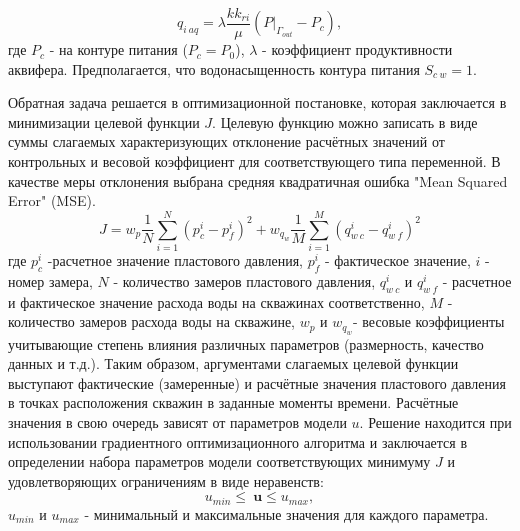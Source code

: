 \documentclass{article}
\begin{document}
\begin{equation} \label{qaq}
q_{i\:aq} = \lambda \frac{kk_{ri}}{\mu}(P|_{\Gamma_{out}}-P_c),
\end{equation}
где $P_{c}$ - на контуре питания ($P_c = P_0$), $\lambda$ - коэффициент продуктивности аквифера. Предполагается, что водонасыщенность контура питания $S_{c\:w} = 1$.

Обратная задача решается в оптимизационной постановке, которая заключается в минимизации целевой функции $J$. Целевую функцию можно записать в виде суммы слагаемых характеризующих отклонение расчётных значений от контрольных и весовой коэффициент для соответствующего типа переменной. В качестве меры отклонения выбрана средняя квадратичная ошибка "Mean Squared Error" (MSE). 
\begin{equation} \label{mape}
	J=w_p\frac{1}{N}\sum_{i=1}^N{\left(p_c^i-p_f^i\right)^2}+w_{q_w}\frac{1}{M}\sum_{i=1}^M{\left(q_{w\:c}^i-q_{w\:f}^i\right)^2}
\end{equation}
где $p_c^i$ -расчетное значение пластового давления, $p_f^i$ - фактическое значение, $i$ - номер замера, $N$ - количество замеров пластового давления, $q_{w\:c}^i$ и $q_{w\:f}^i$ - расчетное и фактическое значение расхода воды на скважинах соответственно, $M$ - количество замеров расхода воды на скважине, $w_p$ и $w_{q_w}$- весовые коэффициенты учитывающие степень влияния различных параметров (размерность, качество данных и т.д.). Таким образом, аргументами слагаемых целевой функции выступают фактические (замеренные) и расчётные значения пластового давления в точках расположения скважин в заданные моменты времени. 
 Расчётные значения в свою очередь зависят от параметров модели $u$. Решение находится при использовании градиентного оптимизационного алгоритма и заключается в определении набора параметров модели соответствующих минимуму $J$ и удовлетворяющих ограничениям в виде неравенств:
\begin{equation*}
u_{min}\leq\ \boldsymbol{u}\leq u_{max},
\end{equation*}
$u_{min}$ и $u_{max}$ - минимальный и максимальные значения для каждого параметра.
\end{document}
